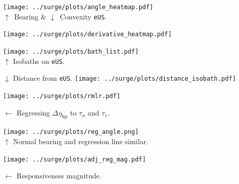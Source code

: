 \begin{frame}{}

\begin{minipage}{0.45\linewidth}

\texttt{[image: ../surge/plots/angle\_heatmap.pdf]}\\
$\uparrow$~Bearing \& $\downarrow$~Convexity \texttt{eUS}.

\texttt{[image: ../surge/plots/derivative\_heatmap.pdf]}

\end{minipage} \begin{minipage}{0.45\linewidth}
\raggedleft
\texttt{[image: ../surge/plots/bath\_list.pdf]}\\
{$\uparrow$ Isobaths on \texttt{eUS}.}

{$\downarrow$ Distance from \texttt{eUS}.}
\texttt{[image: ../surge/plots/distance\_isobath.pdf]}\\

\end{minipage}

\end{frame}

\begin{frame}
\begin{minipage}{0.6\linewidth}
\texttt{[image: ../surge/plots/rmlr.pdf]}

\label{fig:tau-tau-resp}
\end{minipage}
\begin{minipage}{0.3\linewidth}
\raggedright
{$\leftarrow$ Regressing
     $\Delta\eta_{\mathrm{hp}}$ to $\tau_u$ and $\tau_v$.}
\hspace{50pt}

\raggedleft
\texttt{[image: ../surge/plots/reg\_angle.png]}\\
{$\uparrow$ Normal bearing and regression line similar.}
\end{minipage}

 \label{fig:tau-tau-angle}
 \begin{minipage}{0.6\linewidth}
 \texttt{[image: ../surge/plots/adj\_reg\_mag.pdf]}
 \end{minipage}
 \begin{minipage}{0.3\linewidth}
 {$\leftarrow$ Responsiveness magnitude.}
 \end{minipage}
\end{frame}

